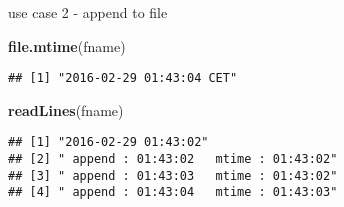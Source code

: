 \documentclass[ignorenonframetext,]{beamer}
\newenvironment{Shaded}{\begin{snugshade}}{\end{snugshade}}
\newcommand{\KeywordTok}[1]{\textcolor[rgb]{0.13,0.29,0.53}{\textbf{{#1}}}}
\newcommand{\NormalTok}[1]{{#1}}
\begin{document}
\begin{frame}[fragile]{use case 2 - append to file}

\begin{Shaded}
\begin{Highlighting}[]
\KeywordTok{file.mtime}\NormalTok{(fname)}
\end{Highlighting}
\end{Shaded}

\begin{verbatim}
## [1] "2016-02-29 01:43:04 CET"
\end{verbatim}

\begin{Shaded}
\begin{Highlighting}[]
\KeywordTok{readLines}\NormalTok{(fname)}
\end{Highlighting}
\end{Shaded}

\begin{verbatim}
## [1] "2016-02-29 01:43:02"                  
## [2] " append : 01:43:02   mtime : 01:43:02"
## [3] " append : 01:43:03   mtime : 01:43:02"
## [4] " append : 01:43:04   mtime : 01:43:03"
\end{verbatim}

\end{frame}
\end{document}
